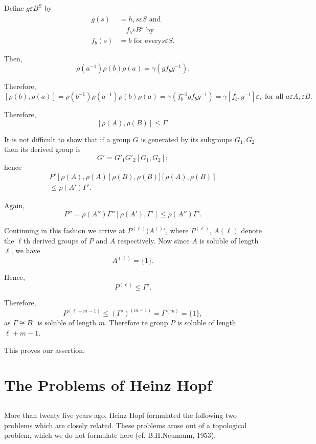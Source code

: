Define $g \varepsilon B^S$ by
\begin{align*}
  g(s) & = \bar{h},  s \varepsilon S \text{ and }\\
  & \quad f_b \varepsilon B^s \text{ by }\\
  f_b(s) & = b \text{ for every} s \varepsilon S.
\end{align*}

Then,
$$
\rho(a^{-1}) \rho (b) \rho (a) = \gamma (gf_b g^{-1}).
$$

Therefore,
$$
[ \rho (b), \rho(a)]= \rho(b^{-1}) \rho(a^{-1}) \rho(b) \rho(a) =
\gamma (f^{-1}_{b} g {f_b} g^{-1}) = \gamma [f_b, g^{-1}] \varepsilon,
\text{ for all } a \varepsilon A, \varepsilon B. 
$$

Therefore,
$$
[\rho (A), \rho (B)] \le \Gamma. 
$$

It is not difficult to show that if a group $G$ is generated by its
subgroups $G_1, G_2$ then its derived group is  
$$
G'= G'_1 G'_2 [G_1, G_2];
$$
hence  
\begin{gather*}
  P' [\rho (A), \rho (A)] \rho (B), \rho (B)] [\rho (A), \rho (B)] \\ 
    \le \rho (A') \Gamma'.  
\end{gather*}

Again,
$$
P'' = \rho (A'') \Gamma '' [\rho (A'), \Gamma '] \le \rho (A '') \Gamma '. 
$$

Continuing in this fashion we arrive at  $P^{(\ell)} (A^{()}{'}$,
where $P^{(\ell)}$, $A(\ell)$ denote the $\ell$th derived groups of
$P$ and $A$ respectively. Now  since $A$ is soluble of length  $\ell$,
we have  
$$
A^{(\ell)}= \{ 1\}.
$$

Hence,
$$
P^{(\ell)} \le \Gamma '. 
$$

Therefore,
$$
P^{(\ell + m-1)} \le  (\Gamma ')^{(m-1)} = \Gamma^{(m)} = \{ 1 \},
$$
as $\Gamma \cong B^s$ is soluble of length $m$.  Therefore te group
$P$ is soluble of length $\ell + m-1$. 

This proves our assertion.

\chapter{The Problems of Heinz Hopf} %

\section{} %

More than  twenty five years ago, Heinz Hopf formulated the following
two problems which are closely related. These problems arose out of a
topological problem, which we do not formulate here  (cf. B.H.Neumann,
1953). 

